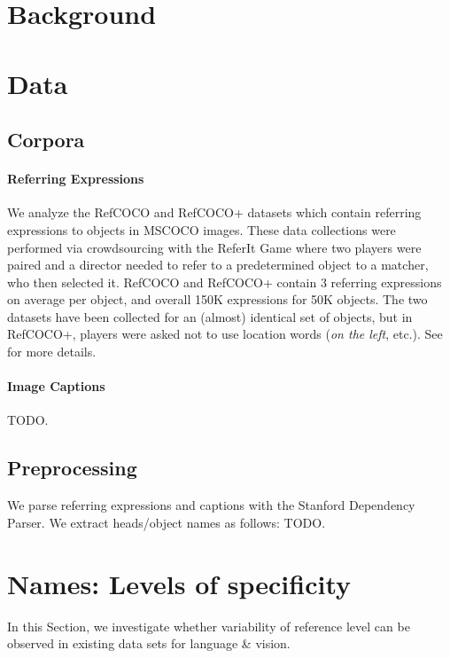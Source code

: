 \documentclass[runningheads]{llncs}
\begin{document}
\section{Background}

\section{Data}

\subsection{Corpora}

\paragraph{Referring Expressions}
We analyze the RefCOCO and RefCOCO+ datasets which contain referring expressions to objects in MSCOCO \cite{mscoco} images.
These data collections were performed via crowdsourcing with the ReferIt Game \cite{Kazemzadeh2014}  where two players were paired and a director needed to refer to a predetermined object to a matcher, who then selected it.
RefCOCO and RefCOCO+ contain 3 referring expressions on average per object, and overall 150K expressions for 50K objects. 
The two datasets have been collected for an (almost) identical set of objects, but in RefCOCO+, players were asked not to use location words (\textit{on the left}, etc.).
See \cite{Yu2016} for more details. 

\paragraph{Image Captions}

TODO.


\subsection{Preprocessing}

We parse referring expressions and captions with the Stanford Dependency Parser.
We extract heads/object names as follows: TODO.

\section{Names: Levels of specificity}

In this Section, we investigate whether variability of reference level can be observed in existing data sets for language \& vision.
\end{document}

